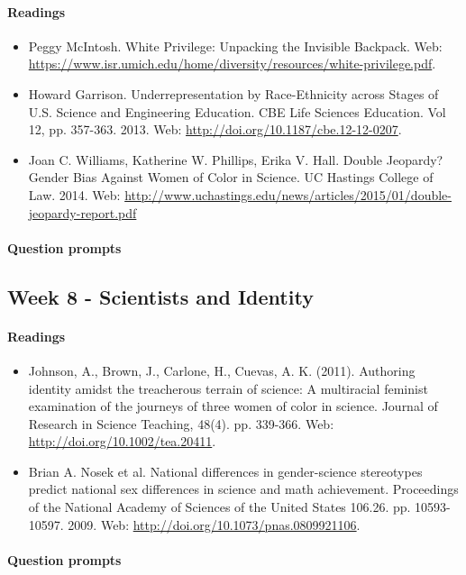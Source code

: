 \documentclass{article}
\begin{document}
\paragraph{Readings}
\begin{itemize}
\item Peggy McIntosh. White Privilege: Unpacking the Invisible Backpack. Web: \url{https://www.isr.umich.edu/home/diversity/resources/white-privilege.pdf}.
\item Howard Garrison. Underrepresentation by Race-Ethnicity across Stages of U.S. Science and Engineering Education. CBE Life Sciences Education. Vol 12, pp. 357-363. 2013. Web: \url{http://doi.org/10.1187/cbe.12-12-0207}.
\item Joan C. Williams, Katherine W. Phillips, Erika V. Hall. Double Jeopardy? Gender Bias Against Women of Color in Science. UC Hastings College of Law. 2014. Web: \url{http://www.uchastings.edu/news/articles/2015/01/double-jeopardy-report.pdf}
\end{itemize}
\paragraph{Question prompts}


\subsection{Week 8 - Scientists and Identity }
\paragraph{Readings}
\begin{itemize}
\item Johnson, A., Brown, J., Carlone, H., Cuevas, A. K. (2011). Authoring identity amidst the treacherous terrain of science: A multiracial feminist examination of the  journeys of three women of color in science. Journal of Research in Science Teaching, 48(4).  pp. 339-366. Web: \url{http://doi.org/10.1002/tea.20411}.
\item Brian A. Nosek et al. National differences in gender-science stereotypes predict national sex differences in science and math achievement. Proceedings of the National Academy of Sciences of the United States 106.26. pp. 10593-10597. 2009. Web: \url{http://doi.org/10.1073/pnas.0809921106}.
\end{itemize}
\paragraph{Question prompts}
\end{document}
